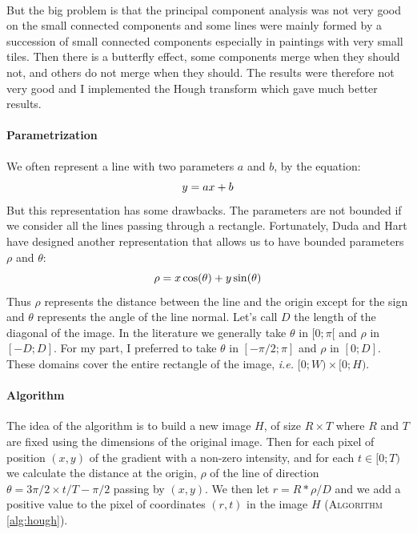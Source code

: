 \documentclass[11pt]{article}
\begin{document}
	\paragraph{}
	But the big problem is that the principal component analysis was not very good on the small connected components and some lines were mainly formed by a succession of small connected components especially in paintings with very small tiles. Then there is a butterfly effect, some components merge when they should not, and others do not merge when they should. The results were therefore not very good and I implemented the Hough transform \cite{hough} which gave much better results.
	
	\paragraph{Parametrization}
	We often represent a line with two parameters $a$ and $b$, by the equation:
	\vspace{-2.2mm} $$ y = ax + b \vspace{-2.2mm} $$ 
	But this representation has some drawbacks. The parameters are not bounded if we consider all the lines passing through a rectangle. Fortunately, Duda and Hart have designed another representation that allows us to have bounded parameters $\rho$ and $\theta$:
	\vspace{-2.2mm} $$ \rho = x \cos(\theta) + y \sin(\theta) \vspace{-2.2mm} $$
	Thus $\rho$ represents the distance between the line and the origin except for the sign and $\theta$ represents the angle of the line normal. Let's call $D$ the length of the diagonal of the image. In the literature we generally take $\theta$ in $[0; \pi[$ and $\rho$ in $[-D; D]$. For my part, I preferred to take $\theta$ in $[-\pi / 2; \pi]$ and $\rho$ in $[0; D]$. These domains cover the entire rectangle of the image, \textit{i.e.} $[0; W) \times[0; H)$.
	
	\paragraph{Algorithm}
	The idea of the algorithm is to build a new image $H$, of size $R \times T$ where $R$ and $T$ are fixed using the dimensions of the original image. Then for each pixel of position $(x, y)$ of the gradient with a non-zero intensity, and for each $t \in[0; T)$ we calculate the distance at the origin, $\rho$ of the line of direction $\theta = 3 \pi / 2 \times t / T - \pi / 2$ passing by $ (x, y)$. We then let $r = R * \rho / D$ and we add a positive value to the pixel of coordinates $(r, t)$ in the image $H$ (\textsc{Algorithm} \ref{alg:hough}).
	
\end{document}

